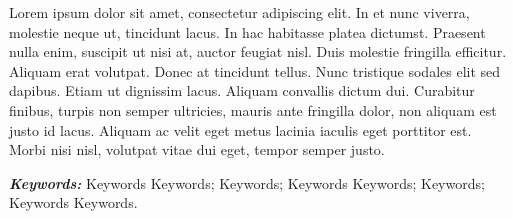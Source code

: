 Lorem ipsum dolor sit amet, consectetur adipiscing elit. In et nunc viverra, molestie neque ut, tincidunt lacus. In hac habitasse platea dictumst. Praesent nulla enim, suscipit ut nisi at, auctor feugiat nisl. Duis molestie fringilla efficitur. Aliquam erat volutpat. Donec at tincidunt tellus. Nunc tristique sodales elit sed dapibus. Etiam ut dignissim lacus. Aliquam convallis dictum dui. Curabitur finibus, turpis non semper ultricies, mauris ante fringilla dolor, non aliquam est justo id lacus. Aliquam ac velit eget metus lacinia iaculis eget porttitor est. Morbi nisi nisl, volutpat vitae dui eget, tempor semper justo.

\textit{\textbf{Keywords:}} Keywords Keywords; Keywords; Keywords Keywords; Keywords; Keywords Keywords.

